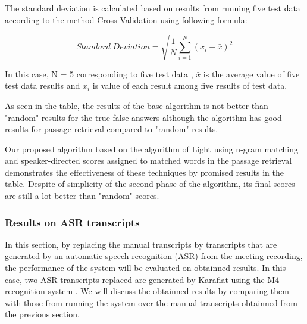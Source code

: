 \documentclass[10pt,a4paper]{article}
\numberwithin{algorithm}{section}  %
\begin{document}
\pagebreak 

The standard deviation is calculated based on results from running five test data according to the method Cross-Validation using following formula:

\begin{equation}
\label{equation: standard deviation}
	Standard \; Deviation = \sqrt{\dfrac{1}{N} \sum_{i=1}^N (x_i -\bar{x} )^2 }
\end{equation}


In this case, N = 5 corresponding to five test data , \ensuremath{\bar{x}} is the average value of five test data results and \ensuremath{x_i} is value of each result among five results of test data.


As seen in the table, the results of the base algorithm is not better than "random" results for the true-false answers although the algorithm has good results for passage retrieval compared to "random" results.

Our proposed algorithm based on the algorithm of Light using n-gram matching and speaker-directed scores assigned to matched words in the passage retrieval demonstrates the effectiveness of these techniques by promised results in the table. Despite of simplicity of the second phase of the algorithm, its final scores are still a lot better than "random" scores.

\pagebreak

\subsubsection*{Results on ASR transcripts}
In this section, by replacing the manual transcripts by transcripts that are generated by an automatic speech recognition (ASR) from the meeting recording, the performance of the system will be evaluated on obtainned results. In this case, two ASR transcripts replaced are generated by Karafiat using the M4 recognition system \cite{wan2004srm}. We will discuss the obtainned results by comparing them with those from running the system over the manual transcripts obtainned from the previous section.
\end{document}
